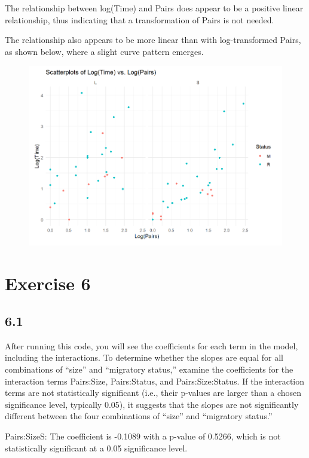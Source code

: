 \documentclass{article}
\begin{document}
The relationship between log(Time) and Pairs does appear to be a positive linear relationship, thus indicating that a transformation of Pairs is not needed.

The relationship also appears to be more linear than with log-transformed Pairs, as shown below, where a slight curve pattern emerges.

\begin{figure}
    \includegraphics[width=\linewidth]{graphs/logtime-logpairs.png}
\end{figure}


\section{Exercise 6}

\subsection*{6.1}



After running this code, you will see the coefficients for each term in the model, including the interactions. To determine whether the slopes are equal for all combinations of “size” and “migratory status,” examine the coefficients for the interaction terms Pairs:Size, Pairs:Status, and Pairs:Size:Status. If the interaction terms are not statistically significant (i.e., their p-values are larger than a chosen significance level, typically 0.05), it suggests that the slopes are not significantly different between the four combinations of “size” and “migratory status.”

Pairs:SizeS: The coefficient is -0.1089 with a p-value of 0.5266, which is not statistically significant at a 0.05 significance level.
\end{document}
